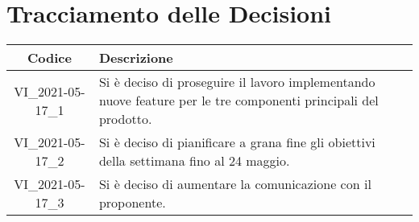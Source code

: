 \section*{Tracciamento delle Decisioni}

\begin{center}
	\begin{longtable}{|c|p{13cm}|}
	\hline
	\rowcolor{lighter-grayer}
	\textbf{Codice} & \textbf{Descrizione} \\
	\hline
	\endfirsthead

	
	
	VI\_2021-05-17\_1 & Si è deciso di proseguire il lavoro implementando nuove feature per le tre componenti principali del prodotto.  \\
	\hline
	VI\_2021-05-17\_2 & Si è deciso di pianificare a grana fine gli obiettivi della settimana fino al 24 maggio.  \\
	\hline
	VI\_2021-05-17\_3 & Si è deciso di aumentare la comunicazione con il proponente.  \\
	\hline

	

	\end{longtable}
\end{center}

